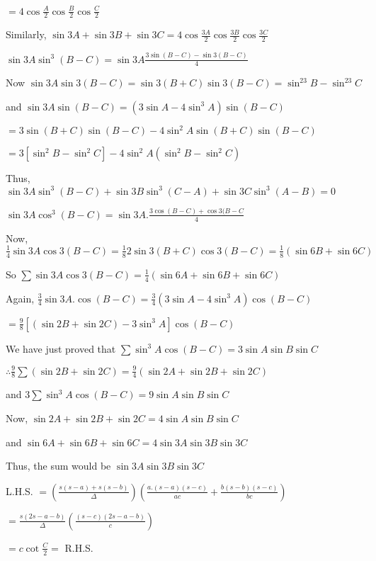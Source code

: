   $= 4\cos\frac{A}{2}\cos\frac{B}{2}\cos\frac{C}{2}$

  Similarly, $\sin3A + \sin3B + \sin3C = 4\cos\frac{3A}{2}\cos\frac{3B}{2}\cos\frac{3C}{2}$

\item $\sin3A\sin^3(B - C) = \sin3A\frac{3\sin(B - C) - \sin3(B - C)}{4}$

  Now $\sin 3A\sin3(B - C) = \sin3(B + C)\sin3(B - C) = \sin^23B - \sin^23C$

  and $\sin 3A\sin(B - C) = (3\sin A - 4\sin^3A)\sin(B - C)$

  $= 3\sin(B + C)\sin(B - C) - 4\sin^2A\sin(B + C)\sin(B - C)$

  $= 3[\sin^2B - \sin^2C] - 4\sin^2A(\sin^2B - \sin^2C)$

  Thus, $\sin3A\sin^3(B - C) + \sin3B\sin^3(C - A) + \sin3C\sin^3(A - B) = 0$

\item $\sin3A\cos^3(B - C) = \sin3A.\frac{3\cos(B - C) + \cos3(B - C}{4}$

  Now, $\frac{1}{4}\sin3A \cos3(B - C) = \frac{1}{8}2\sin3(B + C)\cos3(B - C) = \frac{1}{8}(\sin 6B + \sin 6C)$

  So $\sum \sin3A \cos3(B - C) = \frac{1}{4}(\sin 6A + \sin 6B + \sin 6C)$

  Again, $\frac{3}{4}\sin3A.\cos(B - C) = \frac{3}{4}(3\sin A - 4\sin^3A)\cos(B - C)$

  $= \frac{9}{8}[(\sin 2B + \sin 2C) -3\sin^3A]\cos(B - C)$

  We have just proved that $\sum \sin^3A\cos(B - C) = 3\sin A\sin B\sin C$

  $\therefore \frac{9}{8}\sum(\sin2B + \sin 2C) = \frac{9}{4}(\sin 2A + \sin 2B + \sin 2C)$

  and $3\sum\sin^3A\cos(B - C) = 9\sin A\sin B\sin C$

  Now, $\sin2A + \sin2B + \sin2C = 4\sin A\sin B\sin C$

  and $\sin6A + \sin 6B + \sin6C = 4\sin3A\sin3B\sin3C$

  Thus, the sum would be $\sin 3A\sin3B\sin3C$

\item L.H.S. $= \left(\frac{s(s - a) + s(s - b)}{\Delta}\right)\left(\frac{a.(s - a)(s - c)}{ac} + \frac{b(s - b)(s -
  c)}{bc}\right)$

  $= \frac{s(2s - a - b)}{\Delta}\left(\frac{(s - c)(2s - a - b)}{c}\right)$

  $= c\cot\frac{C}{2} =$ R.H.S.

